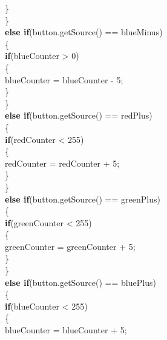 \documentclass[12pt]{article}
\begin{document}
\begin{flushleft}
{\qquad \qquad \qquad \qquad	\qquad					\}\\
\qquad \qquad \qquad	\qquad				\}\\
\qquad \qquad \qquad \qquad					\textbf{else if}(button.getSource() == blueMinus)\\
\qquad \qquad \qquad \qquad					\{\\
\qquad \qquad \qquad \qquad	\qquad				\textbf{if}(blueCounter > 0)\\
\qquad \qquad \qquad \qquad	\qquad					\{\\
\qquad \qquad \qquad \qquad	\qquad \qquad							blueCounter = blueCounter - 5;\\
\qquad \qquad \qquad \qquad	\qquad					\}\\
\qquad \qquad \qquad \qquad				\}\\
\qquad \qquad \qquad \qquad					\textbf{else if}(button.getSource() == redPlus)\\
\qquad \qquad \qquad \qquad				\{\\
\qquad \qquad \qquad \qquad	\qquad				\textbf{if}(redCounter < 255)\\
\qquad \qquad \qquad \qquad	\qquad					\{\\
\qquad \qquad \qquad \qquad	\qquad \qquad						redCounter = redCounter + 5;\\
\qquad \qquad \qquad \qquad	\qquad					\}\\
\qquad \qquad \qquad \qquad					\}\\
\qquad \qquad \qquad \qquad					\textbf{else if}(button.getSource() == greenPlus)\\
\qquad \qquad \qquad \qquad				\{\\
\qquad \qquad \qquad \qquad	\qquad				\textbf{if}(greenCounter < 255)\\
\qquad \qquad \qquad \qquad	\qquad					\{\\
\qquad \qquad \qquad \qquad	\qquad \qquad						greenCounter = greenCounter + 5;\\
\qquad \qquad \qquad \qquad	\qquad						\}\\
\qquad \qquad \qquad \qquad					\}\\
\qquad \qquad \qquad \qquad					\textbf{else if}(button.getSource() == bluePlus)\\
\qquad \qquad \qquad \qquad					\{\\
\qquad \qquad \qquad \qquad	\qquad					\textbf{if}(blueCounter < 255)\\
\qquad \qquad \qquad \qquad	 \qquad				\{\\
\qquad \qquad \qquad \qquad	 \qquad	 \qquad						blueCounter = blueCounter + 5;\\
}
\end{flushleft}
\end{document}
